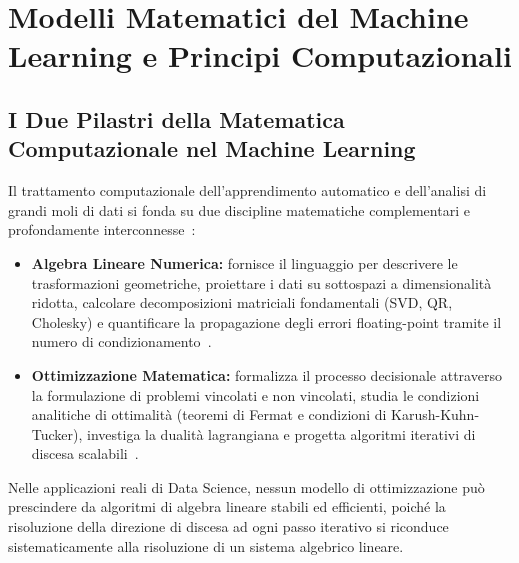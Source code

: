 \chapter{Modelli Matematici del Machine Learning e Principi Computazionali}
\label{chap:modelli-computazionali}

\FloatBarrier
\section{I Due Pilastri della Matematica Computazionale nel Machine Learning}

Il trattamento computazionale dell'apprendimento automatico e dell'analisi di grandi moli di dati si fonda su due discipline matematiche complementari e profondamente interconnesse~\cite{strang2019linear}:
\begin{itemize}
    \item \textbf{Algebra Lineare Numerica:} fornisce il linguaggio per descrivere le trasformazioni geometriche, proiettare i dati su sottospazi a dimensionalit\`a ridotta, calcolare decomposizioni matriciali fondamentali (SVD, QR, Cholesky) e quantificare la propagazione degli errori floating-point tramite il numero di condizionamento~\cite{trefethen1997numerical,demmel1997applied}.
    \item \textbf{Ottimizzazione Matematica:} formalizza il processo decisionale attraverso la formulazione di problemi vincolati e non vincolati, studia le condizioni analitiche di ottimalit\`a (teoremi di Fermat e condizioni di Karush-Kuhn-Tucker), investiga la dualit\`a lagrangiana e progetta algoritmi iterativi di discesa scalabili~\cite{boyd2004convex,nocedal2006numerical,bazaraa2006nonlinear}.
\end{itemize}

Nelle applicazioni reali di Data Science, nessun modello di ottimizzazione pu\`o prescindere da algoritmi di algebra lineare stabili ed efficienti, poich\'e la risoluzione della direzione di discesa ad ogni passo iterativo si riconduce sistematicamente alla risoluzione di un sistema algebrico lineare.

